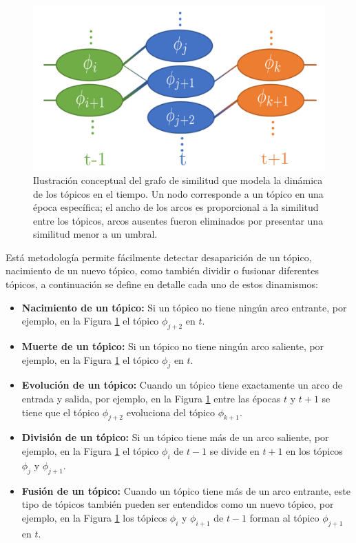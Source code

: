 \documentclass[letterpaper,12pt,oneside]{book} %
\begin{document}
\begin{figure}
    \centering
    \includegraphics[width=1\textwidth]{img/math/similarity_graph.png}
    \caption{Ilustración conceptual del grafo de similitud que modela la dinámica de los tópicos en el tiempo. Un nodo corresponde a un tópico en una época específica; el ancho de los arcos es proporcional a la similitud entre los tópicos, arcos ausentes fueron eliminados por presentar una similitud menor a un umbral.}
    \label{img:graph}
\end{figure}

Está metodología permite fácilmente detectar desaparición de un tópico, nacimiento de un nuevo tópico, como también dividir o fusionar diferentes tópicos, a continuación se define en detalle cada uno de estos dinamismos:

\begin{itemize}
    \item \textbf{Nacimiento de un tópico:} Si un tópico no tiene ningún arco entrante, por ejemplo, en la Figura \ref{img:graph} el tópico $\phi_{j+2}$ en $t$.
    \item \textbf{Muerte de un tópico:} Si un tópico no tiene ningún arco saliente, por ejemplo, en la Figura \ref{img:graph} el tópico $\phi_{j}$ en $t$.
    \item \textbf{Evolución de un tópico:} Cuando un tópico tiene exactamente un arco de entrada y salida, por ejemplo, en la Figura \ref{img:graph} entre las épocas $t$ y $t+1$ se tiene que el tópico $\phi_{j+2}$ evoluciona del tópico $\phi_{k+1}$.
    \item \textbf{División de un tópico:} Si un tópico tiene más de un arco saliente, por ejemplo, en la Figura \ref{img:graph} el tópico $\phi_{i}$ de $t-1$ se divide en $t+1$ en los tópicos $\phi_{j}$ y $\phi_{j+1}$.
    \item \textbf{Fusión de un tópico:} Cuando un tópico tiene más de un arco entrante, este tipo de tópicos también pueden ser entendidos como un nuevo tópico, por ejemplo, en la Figura \ref{img:graph} los tópicos $\phi_{i}$ y $\phi_{i+1}$ de $t-1$ forman al tópico $\phi_{j+1}$ en $t$.
\end{itemize}
\end{document}
